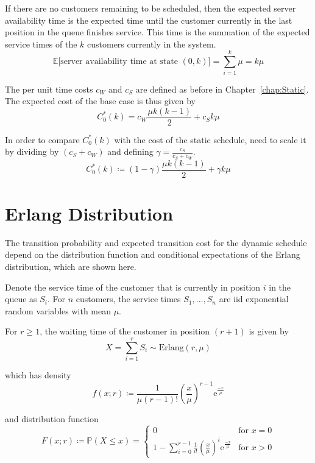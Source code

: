If there are no customers remaining to be scheduled, then the expected server availability time is the expected time until the customer currently in the last position in the queue finishes service. This time is the summation of the expected service times of the $k$ customers currently in the system.
\begin{equation}
	\mathbb{E} \Big[\text{server availability time at state $(0, k)$} \Big] = \sum_{i = 1}^{k} \mu = k \mu
\end{equation}

The per unit time costs $c_{W}$ and $c_{S}$ are defined as before in Chapter~\ref{chap:Static}. The expected cost of the base case is thus given by
\begin{equation}
 	C_{0}^{*} (k) = c_{W} \frac{\mu k (k - 1)}{2} + c_{S} k \mu
\end{equation}

In order to compare $C_{0}^{*} (k)$ with the cost of the static schedule, need to scale it by dividing by $(c_{S} + c_{W})$ and defining $\gamma = \frac{c_{S}}{c_{S} + c_{W}}$.
\begin{equation}
	C_{0}^{*} (k) \coloneqq (1 - \gamma) \frac{\mu k (k - 1)}{2} + \gamma k \mu
\end{equation}

\section{Erlang Distribution}
The transition probability and expected transition cost for the dynamic schedule depend on the distribution function and conditional expectations of the Erlang distribution, which are shown here.

Denote the service time of the customer that is currently in position $i$ in the queue as $S_{i}$. For $n$ customers, the service times $S_{1}, \ldots, S_{n}$ are iid exponential random variables with mean $\mu$.

For $r \geq 1$, the waiting time of the customer in position $(r + 1)$ is given by
\begin{equation}
	X = \sum_{i = 1}^{r} S_{i} \sim \text{Erlang}(r, \mu)
\end{equation}

which has density
\begin{equation}
	f (x; r) \coloneqq \frac{1}{\mu (r - 1)!} \left( \frac{x}{\mu} \right)^{r - 1} \mathrm{e}^{\frac{-x}{\mu}}
\end{equation}

and distribution function
\begin{equation}
	F (x; r) \coloneqq \mathbb{P} (X \leq x) = \begin{cases} 0 & \text{for $x = 0$} \\ 1 - \sum_{i = 0}^{r - 1} \frac{1}{i!} \left( \frac{x}{\mu} \right)^{i} \mathrm{e}^{\frac{-x}{\mu}} & \text{for $x > 0$} \end{cases}
\end{equation}

